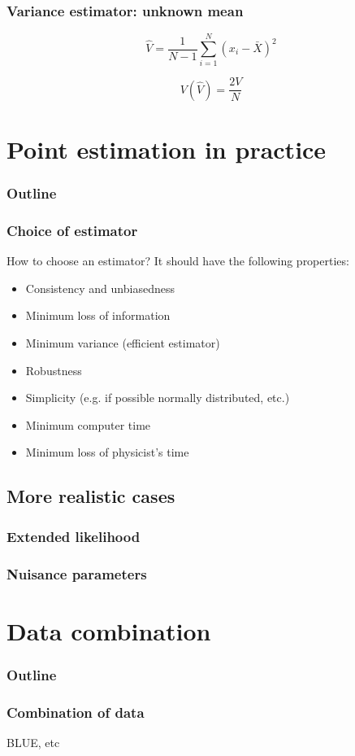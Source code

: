\documentclass[9pt]{beamer}
\begin{document}
\begin{frame}
 \frametitle{Variance estimator: unknown mean}

 \begin{block}{}
  $$\hat{V} = \frac{1}{N-1} \sum_{i=1}^N (x_i - \bar{X})^2$$
 \end{block}
 
 $$V(\hat{V}) = \frac{2V}{N}$$

\end{frame}

\section{Point estimation in practice}

\begin{frame}
 \frametitle{Outline}
 
 \tableofcontents[current]
\end{frame}

\begin{frame}
 \frametitle{Choice of estimator}
 How to choose an estimator? It should have the following properties:
 
 \begin{itemize}
  \item Consistency and unbiasedness
  \item Minimum loss of information
  \item Minimum variance (efficient estimator)
  \item Robustness
  \item Simplicity (e.g. if possible normally distributed, etc.)
  \item Minimum computer time
  \item Minimum loss of physicist's time
 \end{itemize}

\end{frame}

\subsection{More realistic cases}


\begin{frame}
 \frametitle{Extended likelihood}
\end{frame}

\begin{frame}
 \frametitle{Nuisance parameters}
\end{frame}


\section{Data combination}

\begin{frame}
 \frametitle{Outline}
 
 \tableofcontents[current]
\end{frame}


\begin{frame}
 \frametitle{Combination of data}
 
 BLUE, etc
\end{frame}
\end{document}
